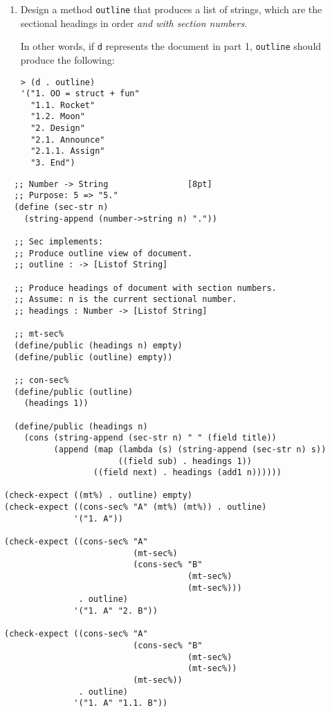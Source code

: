 \documentclass[12pt]{article}                   %
\newenvironment{solution}{}{}
\begin{document}
\begin{problem}
\begin{enumerate}
\newpage
\item Design a method \verb|outline| that produces a list of strings,
  which are the sectional headings in order \emph{and with section
    numbers}.

In other words, if \verb|d| represents the document in part 1,
\verb|outline| should produce the following:
\begin{verbatim}
> (d . outline)
'("1. OO = struct + fun"
  "1.1. Rocket"
  "1.2. Moon"
  "2. Design"
  "2.1. Announce"
  "2.1.1. Assign"
  "3. End")
\end{verbatim}
\end{enumerate}

\begin{solution}
\begin{verbatim}
  ;; Number -> String                [8pt]
  ;; Purpose: 5 => "5."
  (define (sec-str n)
    (string-append (number->string n) "."))

  ;; Sec implements:
  ;; Produce outline view of document.
  ;; outline : -> [Listof String]

  ;; Produce headings of document with section numbers.
  ;; Assume: n is the current sectional number.
  ;; headings : Number -> [Listof String]

  ;; mt-sec%
  (define/public (headings n) empty)
  (define/public (outline) empty))

  ;; con-sec%
  (define/public (outline)
    (headings 1))
    
  (define/public (headings n)
    (cons (string-append (sec-str n) " " (field title))
          (append (map (lambda (s) (string-append (sec-str n) s))
                       ((field sub) . headings 1))
                  ((field next) . headings (add1 n))))))

(check-expect ((mt%) . outline) empty)
(check-expect ((cons-sec% "A" (mt%) (mt%)) . outline)
              '("1. A"))

(check-expect ((cons-sec% "A" 
                          (mt-sec%) 
                          (cons-sec% "B" 
                                     (mt-sec%) 
                                     (mt-sec%))) 
               . outline)
              '("1. A" "2. B"))

(check-expect ((cons-sec% "A" 
                          (cons-sec% "B" 
                                     (mt-sec%) 
                                     (mt-sec%))
                          (mt-sec%))
               . outline)
              '("1. A" "1.1. B"))
\end{verbatim}
\end{solution}

\end{problem}
\end{document}

